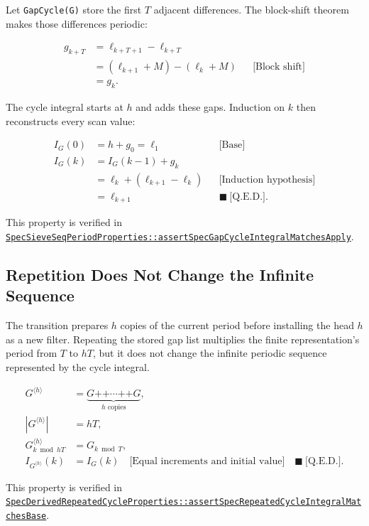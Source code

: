 Let \texttt{GapCycle(G)} store the first $T$ adjacent differences. The
block-shift theorem makes those differences periodic:

\begin{equation*}
\begin{aligned}
g_{k+T}
&=\ell_{k+T+1}-\ell_{k+T} \\
&=(\ell_{k+1}+M)-(\ell_k+M)
  &&\text{[Block shift]} \\
&=g_k.
\end{aligned}
\end{equation*}

The cycle integral starts at $h$ and adds these gaps. Induction on $k$
then reconstructs every scan value:

\begin{equation*}
\begin{aligned}
I_G(0)
&=h+g_0=\ell_1
  &&\text{[Base]} \\
I_G(k)
&=I_G(k-1)+g_k \\
&=\ell_k+(\ell_{k+1}-\ell_k)
  &&\text{[Induction hypothesis]} \\
&=\ell_{k+1}
  &&\blacksquare\ \text{[Q.E.D.]}.
\end{aligned}
\end{equation*}

{\raggedright
This property is verified in
\href{https://github.com/thiagomata/prime-numbers/blob/master/src/main/scala/v1/chapter6/sieve/seq/spec/properties/SpecSieveSeqPeriodProperties.scala}{\texttt{SpecSieveSeqPeriodProperties::assertSpecGapCycleIntegralMatchesApply}}.
\par}

\subsection{Repetition Does Not Change the Infinite Sequence}
\label{sec:repetition-invariance}

The transition prepares $h$ copies of the current period before
installing the head $h$ as a new filter. Repeating the stored gap list
multiplies the finite representation's period from $T$ to $hT$, but it
does not change the infinite periodic sequence represented by the cycle
integral.

\begin{equation*}
\begin{aligned}
G^{\langle h\rangle}
  &=\underbrace{G\mathbin{\texttt{++}}\cdots\mathbin{\texttt{++}}G}_{h\text{ copies}}, \\
|G^{\langle h\rangle}|&=hT, \\
G^{\langle h\rangle}_{k\bmod hT}
  &=G_{k\bmod T}, \\
I_{G^{\langle h\rangle}}(k)
  &=I_G(k)
  \quad\text{[Equal increments and initial value]}\quad\blacksquare\ \text{[Q.E.D.]}.
\end{aligned}
\end{equation*}

{\raggedright
This property is verified in
\href{https://github.com/thiagomata/prime-numbers/blob/master/src/main/scala/v1/chapter6/sieve/seq/spec/properties/SpecDerivedRepeatedCycleProperties.scala}{\texttt{SpecDerivedRepeatedCycleProperties::assertSpecRepeatedCycleIntegralMatchesBase}}.
\par}
